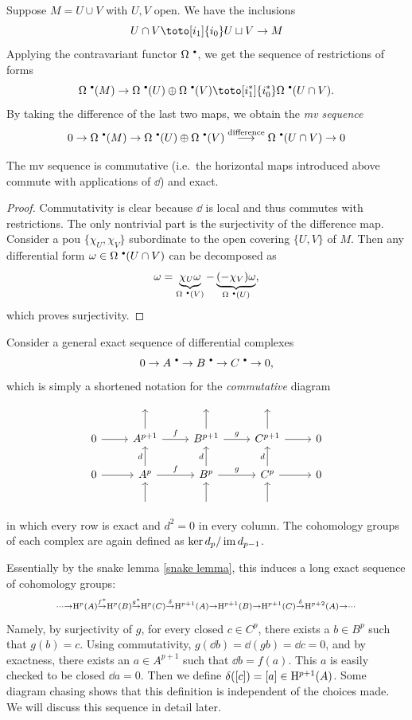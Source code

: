 Suppose $M=U\cup V$ with $U,V$ open. We have the inclusions
\[U\cap V\toto[i_1]{i_0}U\sqcup V\to M \]
Applying the contravariant functor $\Omega^{\smbullet }$, we get the sequence of restrictions of forms
\[\Omega^{\smbullet }(M)\to \Omega^{\smbullet }(U)\oplus\Omega^{\smbullet }(V)\toto[i_1^\ast]{i_0^\ast}\Omega^{\smbullet }(U\cap V).\]
By taking the difference of the last two maps, we obtain the \emph{\gls{mv} sequence}
\[0\to\Omega^{\smbullet } (M)\to\Omega^{\smbullet }(U)\oplus\Omega^{\smbullet }(V)\overset{\text{difference}}\longrightarrow\Omega^{\smbullet } (U\cap V)\to 0\]

\begin{prop}
    The \gls{mv} sequence is commutative (i.e.\ the horizontal maps introduced above commute with applications of $\dd$) and exact.
\end{prop}
\begin{proof}
    Commutativity is clear because $\dd$ is local and thus commutes with restrictions. The only nontrivial part is the surjectivity of the difference map. Consider a \gls{pou} $\{\chi_U,\chi_V\}$ subordinate to the open covering $\{U,V\}$ of $M$. Then any differential form $\omega\in\Omega^{\smbullet }(U\cap V)$ can be decomposed as 
    \[\omega=\underbrace{\chi_U\omega}_{\Omega^{\smbullet }(V)}-\underbrace{(-\chi_V)\omega}_{\Omega^{\smbullet }(U)},\]
    which proves surjectivity.
\end{proof}

Consider a general exact sequence of differential complexes \[0\to A^{\smbullet }\to B^{\smbullet }\to C^{\smbullet } \to 0,\] which is simply a shortened notation for the \emph{commutative} diagram
\[\begin{tikzcd}
        \; & \; & \; &\; &\; \\
        0 \arrow[r]& A^{p+1}\arrow[r,"f"]\arrow[u] &B^{p+1}\arrow[u]\arrow[r,"g"]& C^{p+1}\arrow[r]\arrow[u]& 0\\
       0\arrow[r] & A^p\arrow[r,"f"]\arrow[u,"d"] &B^p\arrow[u,"d"]\arrow[r,"g"]&C^p\arrow[u,"d"]\arrow[r]&0 \\
        &\arrow[u] & \arrow[u]& \arrow[u] &
\end{tikzcd}\]
in which every row is exact and $d^2=0$ in every column. The cohomology groups of each complex are again defined as $\ker d_{p}/\operatorname{im} d_{p-1}$. 

Essentially by the snake lemma \ref{snake lemma}, this induces a long exact sequence of cohomology groups:
\[
\scriptstyle
\cdots\to \mathrm{H}^p(A)\overset{f^\ast}\to \mathrm{H}^p(B)\overset{g^\ast}\to \mathrm{H}^p(C)\overset\delta\to \mathrm{H}^{p+1}(A)\to \mathrm{H}^{p+1}(B)\to \mathrm{H}^{p+1}(C)\overset\delta\to \mathrm{H}^{p+2}(A)\to \cdots
\]
Namely, by surjectivity of $g$, for every closed $c\in C^p$, there exists a $b\in B^p$ such that $g(b)=c$. Using commutativity,  $g(\dd b)=\dd (gb)=\dd c=0$, and by exactness, there exists an $a\in A^{p+1}$ such that $\dd b=f(a)$. This $a$ is easily checked to be closed $\dd a=0$. Then we define $\delta([c])=[a]\in \mathrm{H}^{p+1}(A)$. Some diagram chasing shows that this definition is independent of the choices made. We will discuss this sequence in detail later.


